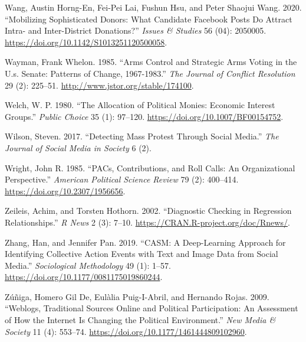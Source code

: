 \documentclass[12pt,]{article}
\begin{document}
\leavevmode\hypertarget{ref-wang2020}{}%
Wang, Austin Horng-En, Fei-Pei Lai, Fushun Hsu, and Peter Shaojui Wang.
2020. ``Mobilizing Sophisticated Donors: What Candidate Facebook Posts
Do Attract Intra- and Inter-District Donations?'' \emph{Issues \&
Studies} 56 (04): 2050005.
\url{https://doi.org/10.1142/S1013251120500058}.

\leavevmode\hypertarget{ref-wayman1985}{}%
Wayman, Frank Whelon. 1985. ``Arms Control and Strategic Arms Voting in
the U.s. Senate: Patterns of Change, 1967-1983.'' \emph{The Journal of
Conflict Resolution} 29 (2): 225--51.
\url{http://www.jstor.org/stable/174100}.

\leavevmode\hypertarget{ref-welch1980}{}%
Welch, W. P. 1980. ``The Allocation of Political Monies: Economic
Interest Groups.'' \emph{Public Choice} 35 (1): 97--120.
\url{https://doi.org/10.1007/BF00154752}.

\leavevmode\hypertarget{ref-wilson2017}{}%
Wilson, Steven. 2017. ``Detecting Mass Protest Through Social Media.''
\emph{The Journal of Social Media in Society} 6 (2).

\leavevmode\hypertarget{ref-wright1985}{}%
Wright, John R. 1985. ``PACs, Contributions, and Roll Calls: An
Organizational Perspective.'' \emph{American Political Science Review}
79 (2): 400--414. \url{https://doi.org/10.2307/1956656}.

\leavevmode\hypertarget{ref-lmtest}{}%
Zeileis, Achim, and Torsten Hothorn. 2002. ``Diagnostic Checking in
Regression Relationships.'' \emph{R News} 2 (3): 7--10.
\url{https://CRAN.R-project.org/doc/Rnews/}.

\leavevmode\hypertarget{ref-zhang2019}{}%
Zhang, Han, and Jennifer Pan. 2019. ``CASM: A Deep-Learning Approach for
Identifying Collective Action Events with Text and Image Data from
Social Media.'' \emph{Sociological Methodology} 49 (1): 1--57.
\url{https://doi.org/10.1177/0081175019860244}.

\leavevmode\hypertarget{ref-dezuniga2009}{}%
Zúñiga, Homero Gil De, Eulàlia Puig-I-Abril, and Hernando Rojas. 2009.
``Weblogs, Traditional Sources Online and Political Participation: An
Assessment of How the Internet Is Changing the Political Environment.''
\emph{New Media \& Society} 11 (4): 553--74.
\url{https://doi.org/10.1177/1461444809102960}.





\newpage
\singlespacing 
\end{document}
